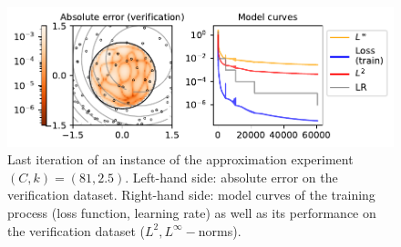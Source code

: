\documentclass[12pt]{report} %
\begin{document}
\begin{figure}[h]
  \includegraphics[width=\textwidth]{imagenes/experiments/2d/statistical_2d_full_scheduler_interpolation/parabola/parabola-TR15-C81-Kgaussian_kernel-Sh1.9531-rrrepetishon-E60521.pdf}
  \caption{Last iteration of an instance of the approximation experiment $(C,k)=(81,2.5)$. Left-hand side: absolute error on the verification dataset. Right-hand side: model curves of the training process (loss function, learning rate) as well as its performance on the verification dataset ($L^2, L^\infty-$norms).}
  \label{fig:parabola-example-training-TR15-C81}
\end{figure}
\end{document}
